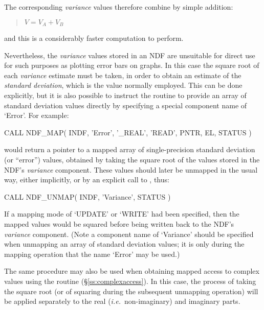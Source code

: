 \documentclass[twoside,11pt,nolof]{starlink}
\providecommand{\st}[1]{{\emph{#1}}}
\begin{document}
The corresponding \st{variance\/} values therefore combine by simple
addition:

\small
\begin{quote}
\begin{center}
$V = V_{A} + V_{B}$
\end{center}
\end{quote}
\normalsize

and this is a considerably faster computation to perform.

Nevertheless, the \st{variance\/} values stored in an NDF are unsuitable
for direct use for such purposes as plotting error bars on graphs.
In this case the square root of each \st{variance\/} estimate must be
taken, in order to obtain an estimate of the \st{standard deviation}, which
is the value normally employed.
This can be done explicitly, but it is also possible to instruct the
 routine to provide an array of standard deviation values directly
by specifying a special component name of `Error'.
For example:

\small
\begin{terminalv}
      CALL NDF_MAP( INDF, 'Error', '_REAL', 'READ', PNTR, EL, STATUS )
\end{terminalv}
\normalsize

would return a pointer to a mapped array of single-precision standard
deviation (or ``error'') values, obtained by taking the square root of the
values stored in the NDF's \st{variance\/} component.
These values should later be unmapped in the usual way, either implicitly,
or by an explicit call to , thus:

\small
\begin{terminalv}
      CALL NDF_UNMAP( INDF, 'Variance', STATUS )
\end{terminalv}
\normalsize

If a mapping mode of `UPDATE' or `WRITE' had been specified, then the mapped
values would be squared before being written back to the NDF's
\st{variance\/} component.
(Note a component name of `Variance' should be specified when unmapping an
array of standard deviation values; it is only during the mapping operation
that the name `Error' may be used.)

The same procedure may also be used when obtaining mapped access to complex
values using the routine  (\S\ref{ss:complexaccess}).
In this case, the process of taking the square root (or of squaring during
the subsequent unmapping operation) will be applied separately to the real
(\st{i.e.}\ non-imaginary) and imaginary parts.
\end{document}
